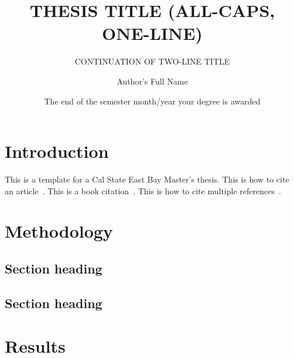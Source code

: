 \documentclass{csuebthesis} %
\title{THESIS TITLE (ALL-CAPS, ONE-LINE)}
\subtitle{CONTINUATION OF TWO-LINE TITLE}
\author{Author's Full Name}
\date{The end of the semester month/year your degree is awarded}
\begin{document}
\frontmatter

\maketitle

\begin{abstract}

\lipsum[1]

\end{abstract}

\makesignature

\begin{acknowledgements}

\lipsum[1]

\end{acknowledgements}

\tableofcontents
\listoffigures
\listoftables

\mainmatter

\chapter{Introduction}

This is a template for a Cal State East Bay Master's thesis. This is how to cite an article~\cite{reynoldsJCP82}\@. This is a book citation~\cite{miessler}\@. This is how to cite multiple references~\cite{reynoldsJCP82,ceperleyPRL90,miessler}\@.

\lipsum[1]

\chapter{Methodology}

\lipsum[1]

\section{Section heading}

\lipsum[2-5]

\section{Section heading}

\lipsum[6-10]

\chapter{Results}
\end{document}
